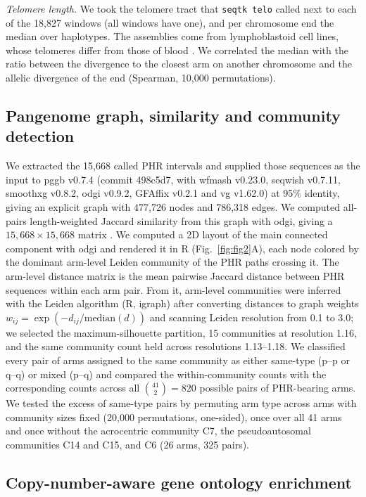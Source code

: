\documentclass[pdflatex,mathphys]{jnl}
\begin{document}
\emph{Telomere length.} We took the telomere tract that \texttt{seqtk telo} called next to each of
the 18,827 windows (all windows have one), and per chromosome end the median over haplotypes. The
assemblies come from lymphoblastoid cell lines, whose telomeres differ from those of blood
\cite{Lucas2026}. We correlated the median with the ratio between the divergence to the closest arm
on another chromosome and the allelic divergence of the end (Spearman, 10,000 permutations).

\subsection*{Pangenome graph, similarity and community detection}

We extracted the 15,668 called PHR intervals and supplied those sequences as the
input to pggb v0.7.4 (commit 498c5d7, with wfmash v0.23.0, seqwish v0.7.11, smoothxg v0.8.2, odgi v0.9.2, GFAffix v0.2.1 and vg v1.62.0) at 95\% identity, giving an explicit graph with 477,726 nodes and 786,318 edges. We computed all-pairs length-weighted Jaccard similarity from this graph with odgi, giving a $15{,}668 \times
15{,}668$ matrix
\cite{Garrison2024pggb,pangenome_graphs_odgi_GuarracinoHeumos2022,andreace2023pangenome,heumos2024nfcore}.
We computed a 2D layout of the main connected component with odgi and rendered it
in R (Fig.~\ref{fig:fig2}A), each node colored by the dominant arm-level Leiden
community of the PHR paths crossing it. The arm-level distance matrix is the mean
pairwise Jaccard distance between PHR sequences within each arm pair. From it, arm-level
communities were inferred with the Leiden algorithm (R, igraph) after converting distances to graph weights
$w_{ij} = \exp(-d_{ij} / \mathrm{median}(d))$ and scanning Leiden resolution from
0.1 to 3.0; we selected the maximum-silhouette partition, 15 communities at
resolution 1.16, and the same community count held across resolutions 1.13--1.18.
We classified every pair of arms assigned to the same community as either
same-type (p--p or q--q) or mixed (p--q) and compared the
within-community counts with the corresponding counts across all
$\binom{41}{2}=820$ possible pairs of PHR-bearing arms.
We tested the excess of same-type pairs by permuting arm type across arms with community sizes
fixed (20,000 permutations, one-sided), once over all 41 arms and once without the acrocentric
community C7, the pseudoautosomal communities C14 and C15, and C6 (26 arms, 325 pairs).

\subsection*{Copy-number-aware gene ontology enrichment}
\end{document}
